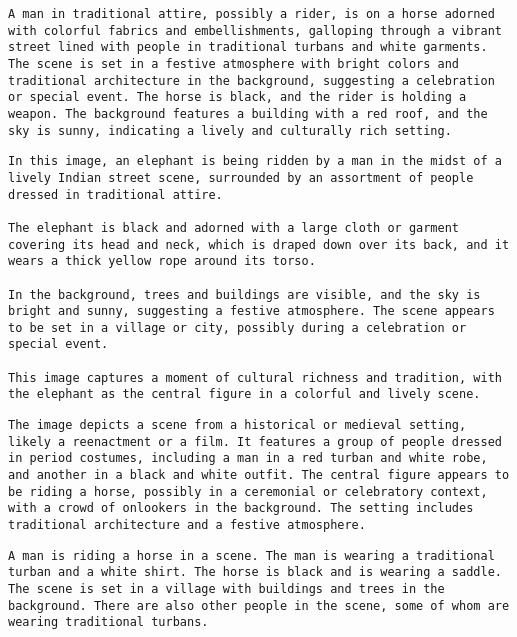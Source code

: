 \begin{lstlisting}[caption={Captions using Ensemble with Llama for 2296.jpg}]
A man in traditional attire, possibly a rider, is on a horse adorned with colorful fabrics and embellishments, galloping through a vibrant street lined with people in traditional turbans and white garments. The scene is set in a festive atmosphere with bright colors and traditional architecture in the background, suggesting a celebration or special event. The horse is black, and the rider is holding a weapon. The background features a building with a red roof, and the sky is sunny, indicating a lively and culturally rich setting.
\end{lstlisting}


\begin{lstlisting}[caption={Captions using Llama 3.2 for 2296.jpg}]
In this image, an elephant is being ridden by a man in the midst of a lively Indian street scene, surrounded by an assortment of people dressed in traditional attire.

The elephant is black and adorned with a large cloth or garment covering its head and neck, which is draped down over its back, and it wears a thick yellow rope around its torso.

In the background, trees and buildings are visible, and the sky is bright and sunny, suggesting a festive atmosphere. The scene appears to be set in a village or city, possibly during a celebration or special event.

This image captures a moment of cultural richness and tradition, with the elephant as the central figure in a colorful and lively scene.
\end{lstlisting}


\begin{lstlisting}[caption={Captions using Phi 4 for 2296.jpg}]
The image depicts a scene from a historical or medieval setting, likely a reenactment or a film. It features a group of people dressed in period costumes, including a man in a red turban and white robe, and another in a black and white outfit. The central figure appears to be riding a horse, possibly in a ceremonial or celebratory context, with a crowd of onlookers in the background. The setting includes traditional architecture and a festive atmosphere.
\end{lstlisting}


\begin{lstlisting}[caption={Captions using Phi 4 with SAM 2 for 2296.jpg}]
A man is riding a horse in a scene. The man is wearing a traditional turban and a white shirt. The horse is black and is wearing a saddle. The scene is set in a village with buildings and trees in the background. There are also other people in the scene, some of whom are wearing traditional turbans.
\end{lstlisting}


